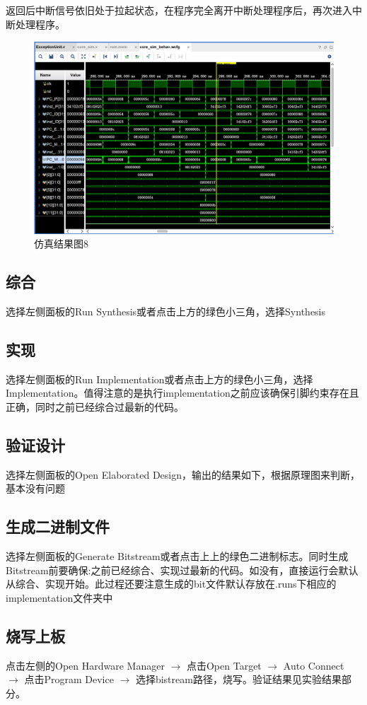 返回后中断信号依旧处于拉起状态，在程序完全离开中断处理程序后，再次进入中断处理程序。
\begin{figure}[H] %
	\centering %
	\includegraphics[width=1.0\textwidth]{figs/6.png} %
	\caption{仿真结果图8} %
	\label{Fig.18} %
\end{figure}
\subsection{综合} 选择左侧面板的Run Synthesis或者点击上方的绿色小三角，选择Synthesis
\subsection{实现} 选择左侧面板的Run Implementation或者点击上方的绿色小三角，选择Implementation。值得注意的是执行implementation之前应该确保引脚约束存在且正确，同时之前已经综合过最新的代码。
\subsection{验证设计} 选择左侧面板的Open Elaborated Design，输出的结果如下，根据原理图来判断，基本没有问题
\subsection{生成二进制文件} 选择左侧面板的Generate Bitstream或者点击上上的绿色二进制标志。同时生成Bitstream前要确保:之前已经综合、实现过最新的代码。如没有，直接运行会默认从综合、实现开始。此过程还要注意生成的bit文件默认存放在.runs下相应的implementation文件夹中
\subsection{烧写上板} 点击左侧的Open Hardware Manager $\rightarrow$ 点击Open Target $\rightarrow$ Auto Connect $\rightarrow$ 点击Program Device $\rightarrow$ 选择bistream路径，烧写。验证结果见实验结果部分。
